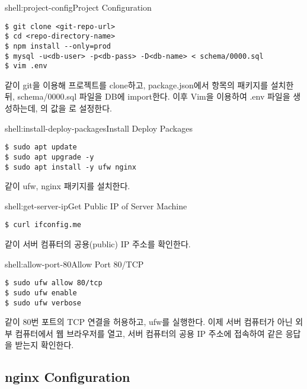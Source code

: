 \begin{shellenv}{shell:project-config}{Project Configuration}\begin{verbatim}
$ git clone <git-repo-url>
$ cd <repo-directory-name>
$ npm install --only=prod
$ mysql -u<db-user> -p<db-pass> -D<db-name> < schema/0000.sql
$ vim .env
\end{verbatim}
\end{shellenv}

\와 같이 git을 이용해 프로젝트를 clone하고, package.json에서  항목의 패키지를 설치한 뒤, schema/0000.sql 파일을 DB에 import한다. 이후 Vim을 이용하여 .env 파일을 생성하는데, 의 값을 로 설정한다.

\begin{shellenv}{shell:install-deploy-packages}{Install Deploy Packages}\begin{verbatim}
$ sudo apt update
$ sudo apt upgrade -y
$ sudo apt install -y ufw nginx
\end{verbatim}
\end{shellenv}

\와 같이 ufw, nginx 패키지를 설치한다.

\begin{shellenv}{shell:get-server-ip}{Get Public IP of Server Machine}\begin{verbatim}
$ curl ifconfig.me
\end{verbatim}
\end{shellenv}

\와 같이 서버 컴퓨터의 공용(public) IP 주소를 확인한다.

\begin{shellenv}{shell:allow-port-80}{Allow Port 80/TCP}\begin{verbatim}
$ sudo ufw allow 80/tcp
$ sudo ufw enable
$ sudo ufw verbose
\end{verbatim}
\end{shellenv}

\과 같이 80번 포트의 TCP 연결을 허용하고, ufw를 실행한다. 이제 서버 컴퓨터가 아닌 외부 컴퓨터에서 웹 브라우저를 열고, 서버 컴퓨터의 공용 IP 주소에 접속하여 \와 같은 응답을 받는지 확인한다.


\subsection*{nginx Configuration}

